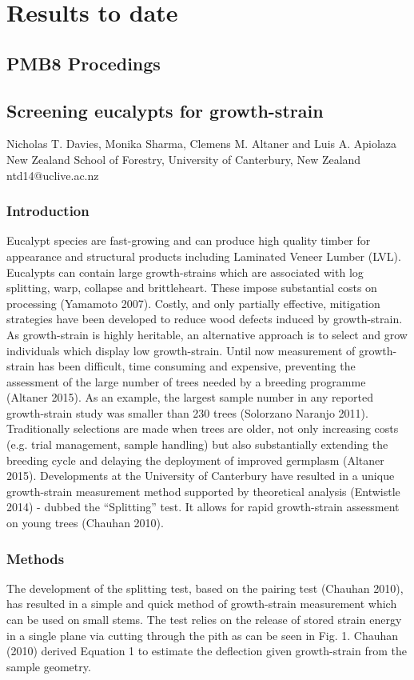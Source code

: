 \section{Results to date}
\subsection{PMB8 Procedings}
\subsection{Screening eucalypts for growth-strain}
Nicholas T. Davies, Monika Sharma, Clemens M. Altaner and Luis A. Apiolaza
New Zealand School of Forestry, University of Canterbury, New Zealand
ntd14@uclive.ac.nz 
\subsubsection{Introduction}
Eucalypt species are fast-growing and can produce high quality timber for appearance and structural products including Laminated Veneer Lumber (LVL). Eucalypts can contain large growth-strains which are associated with log splitting, warp, collapse and brittleheart. These impose substantial costs on processing (Yamamoto 2007). Costly, and only partially effective, mitigation strategies have been developed to reduce wood defects induced by growth-strain. As growth-strain is highly heritable, an alternative approach is to select and grow individuals which display low growth-strain. Until now measurement of growth-strain has been difficult, time consuming and expensive, preventing the assessment of the large number of trees needed by a breeding programme (Altaner 2015). As an example, the largest sample number in any reported growth-strain study was smaller than 230 trees (Solorzano Naranjo 2011). Traditionally selections are made when trees are older, not only increasing costs (e.g. trial management, sample handling) but also substantially extending the breeding cycle and delaying the deployment of improved germplasm (Altaner 2015). Developments at the University of Canterbury have resulted in a unique growth-strain measurement method supported by theoretical analysis (Entwistle 2014) - dubbed the “Splitting” test. It allows for rapid growth-strain assessment on young trees (Chauhan 2010).

\subsubsection{Methods}
The development of the splitting test, based on the pairing test (Chauhan 2010), has resulted in a simple and quick method of growth-strain measurement which can be used on small stems. The test relies on the release of stored strain energy in a single plane via cutting through the pith as can be seen in Fig. 1. Chauhan (2010) derived Equation 1 to estimate the deflection given growth-strain from the sample geometry.




  